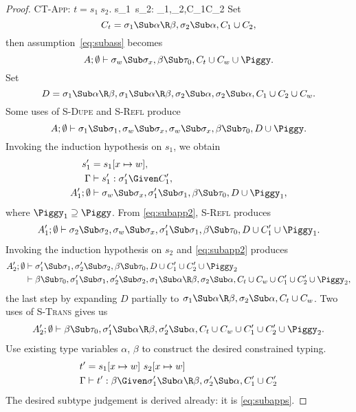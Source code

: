 \begin{proof}
\Case\textsc{CT-App}: $t=s_1~s_2$.
{\Gamma\vdash s_1~s_2:\beta\Given
\sigma_1\Sub\alpha\R\beta,\sigma_2\Sub\alpha,C_1\cup C_2
}
Set
\[
C_t=\sigma_1\Sub\alpha\R\beta,\sigma_2\Sub\alpha,C_1\cup C_2,
\]
then assumption~\eqref{eq:subass} becomes
\[
A;\Exigent\vdash
  \sigma_\Xdef\Sub\sigma_x,
  \beta\Sub\tau_0,
  C_t\cup C_\Xdef\cup\Piggy.
\]
Set
\[
D=
\sigma_1\Sub\alpha\R\beta,
\sigma_1\Sub\alpha\R\beta,
\sigma_2\Sub\alpha,
\sigma_2\Sub\alpha,C_1\cup C_2\cup C_\Xdef.
\]
Some uses of \textsc{S-Dupe} and \textsc{S-Refl} produce
\[
A;\Exigent\vdash
  \sigma_1\Sub\sigma_1,
  \sigma_\Xdef\Sub\sigma_x,\sigma_\Xdef\Sub\sigma_x,
  \beta\Sub\tau_0,
  D\cup\Piggy.
\]
Invoking the induction hypothesis on $s_1$, we obtain
\begin{align}
s_1'&=s_1[x\mapsto \Xdef]\notag,
\\
\Gamma&\vdash s_1' : \sigma_1' \Given C_1',
\label{eq:subapp1}
\\
A_1';\Exigent&\vdash
  \sigma_\Xdef\Sub\sigma_x,
  \sigma_1'\Sub\sigma_1,
  \beta\Sub\tau_0,
  D\cup\Piggy_1,
\label{eq:subapp2}
\end{align}
where $\Piggy_1\supseteq\Piggy$. From \eqref{eq:subapp2},
\textsc{S-Refl} produces
\begin{align}
A_1';\Exigent\vdash
  \sigma_2\Sub\sigma_2,
  \sigma_\Xdef\Sub\sigma_x,
  \sigma_1'\Sub\sigma_1,
  \beta\Sub\tau_0,
  D\cup C_1'\cup\Piggy_1.
\label{eq:subappf}
\end{align}
Invoking the induction hypothesis on $s_2$ and \eqref{eq:subapp2}
produces
\begin{align}
A_2';\Exigent&\vdash
  \sigma_1'\Sub\sigma_1,
  \sigma_2'\Sub\sigma_2,
  \beta\Sub\tau_0,
  D\cup C_1'\cup C_2'\cup\Piggy_2
\notag\\
&\vdash
  \beta\Sub\tau_0,
  \sigma_1'\Sub\sigma_1,
  \sigma_2'\Sub\sigma_2,
  \sigma_1\Sub\alpha\R\beta,\sigma_2\Sub\alpha,
  C_t\cup C_\Xdef\cup C_1'\cup C_2'\cup\Piggy_2,
\notag
\end{align}
the last step by expanding $D$ partially to
$\sigma_1\Sub\alpha\R\beta,\sigma_2\Sub\alpha,C_t\cup C_\Xdef$.
Two uses of \textsc{S-Trans} gives us
\begin{align}
A_2';\Exigent\vdash
  \beta\Sub\tau_0,
  \sigma_1'\Sub\alpha\R\beta,\sigma_2'\Sub\alpha,
  C_t\cup C_\Xdef\cup C_1'\cup C_2'\cup\Piggy_2.
\label{eq:subapps}
\end{align}
Use existing type variables $\alpha$, $\beta$ to construct the
desired constrained typing.
\begin{align}
t'&=s_1[x\mapsto \Xdef]~s_2[x\mapsto \Xdef]
\notag\\
\Gamma&\vdash t':
\beta\Given
\sigma_1'\Sub\alpha\R\beta,\sigma_2'\Sub\alpha,
C_1'\cup C_2'
\notag
\end{align}
The desired subtype judgement is derived already: it is
\eqref{eq:subapps}.


\end{proof}
